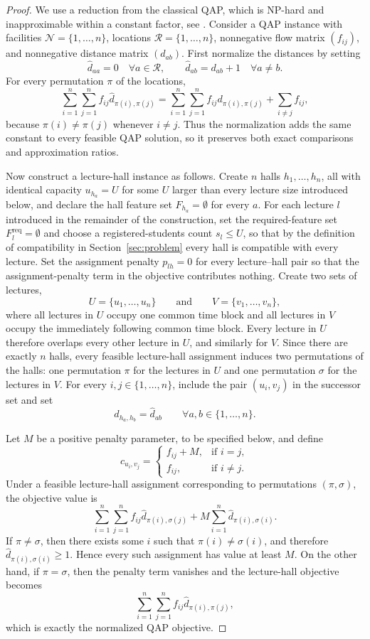\documentclass[11pt]{article}
\begin{document}
\begin{proof}
We use a reduction from the classical QAP, which is NP-hard and inapproximable within a constant factor, see
\citet{sahni1976p,burkard1998,loiola2007}. Consider a QAP instance with facilities $\mathcal{N}=\{1,\dots,n\}$, locations $\mathcal{R}=\{1,\dots,n\}$, nonnegative flow matrix $(f_{ij})$, and nonnegative distance matrix $(d_{ab})$. First normalize the distances by setting
\[
\hat d_{aa}=0 \quad \forall a \in \mathcal{R},
\qquad
\hat d_{ab}=d_{ab}+1 \quad \forall a \neq b.
\]
For every permutation $\pi$ of the locations,
\[
\sum_{i=1}^n \sum_{j=1}^n f_{ij}\hat d_{\pi(i),\pi(j)}
=
\sum_{i=1}^n \sum_{j=1}^n f_{ij}d_{\pi(i),\pi(j)}
+
\sum_{i \neq j} f_{ij},
\]
because $\pi(i)\neq \pi(j)$ whenever $i\neq j$. Thus the normalization adds the same constant to every feasible QAP solution, so it preserves both exact comparisons and approximation ratios.

Now construct a lecture-hall instance as follows. Create $n$ halls $h_1,\dots,h_n$, all with identical capacity $u_{h_a} = U$ for some $U$ larger than every lecture size introduced below, and declare the hall feature set $F_{h_a}=\emptyset$ for every $a$. For each lecture $l$ introduced in the remainder of the construction, set the required-feature set $F_l^{\mathrm{req}}=\emptyset$ and choose a registered-students count $s_l \le U$, so that by the definition of compatibility in Section~\ref{sec:problem} every hall is compatible with every lecture. Set the assignment penalty $p_{lh}=0$ for every lecture--hall pair so that the assignment-penalty term in the objective contributes nothing. Create two sets of lectures,
\[
U=\{u_1,\dots,u_n\}
\qquad \text{and} \qquad
V=\{v_1,\dots,v_n\},
\]
where all lectures in $U$ occupy one common time block and all lectures in $V$ occupy the immediately following common time block. Every lecture in $U$ therefore overlaps every other lecture in $U$, and similarly for $V$. Since there are exactly $n$ halls, every feasible lecture-hall assignment induces two permutations of the halls: one permutation $\pi$ for the lectures in $U$ and one permutation $\sigma$ for the lectures in $V$. For every $i,j \in \{1,\dots,n\}$, include the pair $(u_i,v_j)$ in the successor set and set
\[
d_{h_a,h_b}=\hat d_{ab} \qquad \forall a,b \in \{1,\dots,n\}.
\]

Let $M$ be a positive penalty parameter, to be specified below, and define
\[
c_{u_i,v_j}=
\begin{cases}
f_{ij}+M, & \text{if } i=j,\\
f_{ij}, & \text{if } i\neq j.
\end{cases}
\]
Under a feasible lecture-hall assignment corresponding to permutations $(\pi,\sigma)$, the objective value is
\[
\sum_{i=1}^n \sum_{j=1}^n f_{ij}\hat d_{\pi(i),\sigma(j)}
+
M\sum_{i=1}^n \hat d_{\pi(i),\sigma(i)}.
\]
If $\pi\neq \sigma$, then there exists some $i$ such that $\pi(i)\neq \sigma(i)$, and therefore $\hat d_{\pi(i),\sigma(i)}\ge 1$. Hence every such assignment has value at least $M$. On the other hand, if $\pi=\sigma$, then the penalty term vanishes and the lecture-hall objective becomes
\[
\sum_{i=1}^n \sum_{j=1}^n f_{ij}\hat d_{\pi(i),\pi(j)},
\]
which is exactly the normalized QAP objective.


\end{proof}
\end{document}
